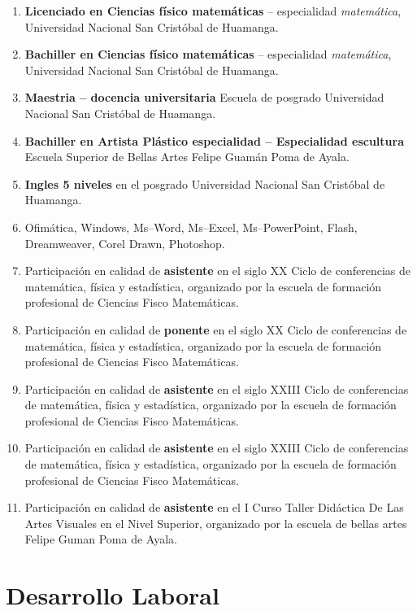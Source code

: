 \documentclass[]{krantz}
\begin{document}
\begin{enumerate}
\def\labelenumi{\arabic{enumi}.}
\item
  \textbf{Licenciado en Ciencias físico matemáticas} -- especialidad \emph{matemática}, Universidad Nacional San Cristóbal de Huamanga.
\item
  \textbf{Bachiller en Ciencias físico matemáticas} -- especialidad \emph{matemática}, Universidad Nacional San Cristóbal de Huamanga.
\item
  \textbf{Maestria -- docencia universitaria} Escuela de posgrado Universidad Nacional San Cristóbal de Huamanga.
\item
  \textbf{Bachiller en Artista Plástico especialidad -- Especialidad escultura} Escuela Superior de Bellas Artes Felipe Guamán Poma de Ayala.
\item
  \textbf{Ingles 5 niveles} en el posgrado Universidad Nacional San Cristóbal de Huamanga.
\item
  Ofimática, Windows, Ms--Word, Ms--Excel, Ms--PowerPoint, Flash, Dreamweaver, Corel Drawn, Photoshop.
\item
  Participación en calidad de \textbf{asistente} en el siglo XX Ciclo de conferencias de matemática, física y estadística, organizado por la escuela de formación profesional de Ciencias Fisco Matemáticas.
\item
  Participación en calidad de \textbf{ponente} en el siglo XX Ciclo de conferencias de matemática, física y estadística, organizado por la escuela de formación profesional de Ciencias Fisco Matemáticas.
\item
  Participación en calidad de \textbf{asistente} en el siglo XXIII Ciclo de conferencias de matemática, física y estadística, organizado por la escuela de formación profesional de Ciencias Fisco Matemáticas.
\item
  Participación en calidad de \textbf{asistente} en el siglo XXIII Ciclo de conferencias de matemática, física y estadística, organizado por la escuela de formación profesional de Ciencias Fisco Matemáticas.
\item
  Participación en calidad de \textbf{asistente} en el I Curso Taller Didáctica De Las Artes Visuales en el Nivel Superior, organizado por la escuela de bellas artes Felipe Guman Poma de Ayala.
\end{enumerate}

\hypertarget{desarrollo-laboral}{%
\section*{Desarrollo Laboral}\label{desarrollo-laboral}}
\end{document}
